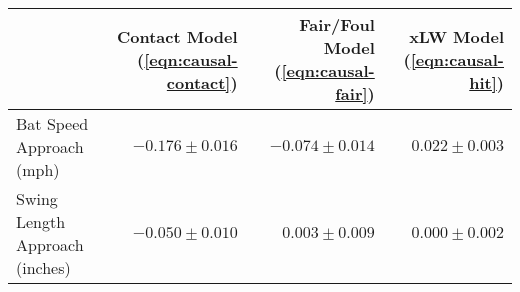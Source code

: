 \begin{tabular}{l|r|r|r|}
 & Contact Model (\ref{eqn:causal-contact}) & Fair/Foul Model (\ref{eqn:causal-fair}) & xLW Model (\ref{eqn:causal-hit}) \\
  \hline
Bat Speed Approach (mph) & $-0.176 \pm0.016$ & $-0.074 \pm0.014$ & $0.022 \pm0.003$ \\ 
  Swing Length Approach (inches) & $-0.050 \pm0.010$ & $0.003 \pm0.009$ & $0.000 \pm0.002$ \\ 
\end{tabular}
